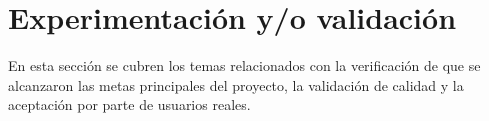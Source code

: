 \section{Experimentación y/o validación}

En esta sección se cubren los temas relacionados con la verificación de que se alcanzaron las metas principales del proyecto,
la validación de calidad y la aceptación por parte de usuarios reales.





